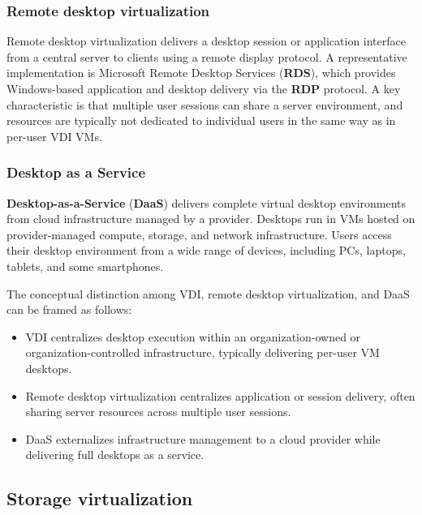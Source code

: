 \documentclass[11pt,a4paper,openany]{report}
\begin{document}
\subsubsection*{Remote desktop virtualization}

Remote desktop virtualization delivers a desktop session or application interface from a central server to clients using a remote display protocol. A representative implementation is Microsoft Remote Desktop Services (\textbf{RDS}), which provides Windows-based application and desktop delivery via the \textbf{RDP} protocol. A key characteristic is that multiple user sessions can share a server environment, and resources are typically not dedicated to individual users in the same way as in per-user VDI VMs.

\subsubsection*{Desktop as a Service}

\textbf{Desktop-as-a-Service} (\textbf{DaaS}) delivers complete virtual desktop environments from cloud infrastructure managed by a provider. Desktops run in VMs hosted on provider-managed compute, storage, and network infrastructure. Users access their desktop environment from a wide range of devices, including PCs, laptops, tablets, and some smartphones.

The conceptual distinction among VDI, remote desktop virtualization, and DaaS can be framed as follows:

\begin{itemize}
\item VDI centralizes desktop execution within an organization-owned or organization-controlled infrastructure, typically delivering per-user VM desktops.
\item Remote desktop virtualization centralizes application or session delivery, often sharing server resources across multiple user sessions.
\item DaaS externalizes infrastructure management to a cloud provider while delivering full desktops as a service.
\end{itemize}

\subsection{Storage virtualization}
\end{document}
